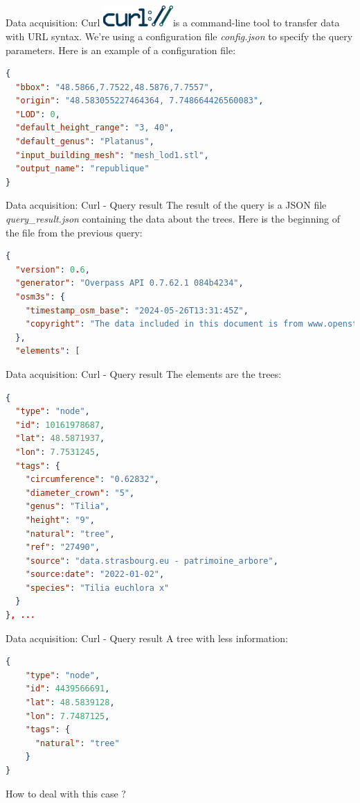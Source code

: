 \documentclass[10pt]{beamer}
\begin{document}
\begin{frame}[fragile]{Data acquisition: Curl}
  \includegraphics[width=0.2\textwidth]{images/Curl-logo.svg.png}is a command-line tool to transfer data with URL syntax.
  We're using a configuration file \textit{config.json} to specify the query parameters.
  Here is an example of a configuration file:
\begin{lstlisting}[language=json]
{
  "bbox": "48.5866,7.7522,48.5876,7.7557",
  "origin": "48.583055227464364, 7.748664426560083",
  "LOD": 0,
  "default_height_range": "3, 40",
  "default_genus": "Platanus",
  "input_building_mesh": "mesh_lod1.stl",
  "output_name": "republique"
}
\end{lstlisting}
\end{frame}

\begin{frame}[fragile]{Data acquisition: Curl - Query result} 
  The result of the query is a JSON file \textit{query\_result.json} containing the data about the trees.
Here is the beginning of the file from the previous query:

\begin{lstlisting}[language=json]
{
  "version": 0.6,
  "generator": "Overpass API 0.7.62.1 084b4234",
  "osm3s": {
    "timestamp_osm_base": "2024-05-26T13:31:45Z",
    "copyright": "The data included in this document is from www.openstreetmap.org. The data is made available under ODbL."
  },
  "elements": [
\end{lstlisting}
\end{frame}

\begin{frame}[fragile]{Data acquisition: Curl - Query result}
 The elements are the trees:

\begin{lstlisting}[language=json]
{
  "type": "node",
  "id": 10161978687,
  "lat": 48.5871937,
  "lon": 7.7531245,
  "tags": {
    "circumference": "0.62832",
    "diameter_crown": "5",
    "genus": "Tilia",
    "height": "9",
    "natural": "tree",
    "ref": "27490",
    "source": "data.strasbourg.eu - patrimoine_arbore",
    "source:date": "2022-01-02",
    "species": "Tilia euchlora x"
  }
}, ...
\end{lstlisting}
\end{frame}

\begin{frame}[fragile]{Data acquisition: Curl - Query result}
  A tree with less information:

\begin{lstlisting}[language=json]
{
    "type": "node",
    "id": 4439566691,
    "lat": 48.5839128,
    "lon": 7.7487125,
    "tags": {
      "natural": "tree"
    }
}
\end{lstlisting}
\vfill
How to deal with this case ?
\end{frame}
\end{document}

